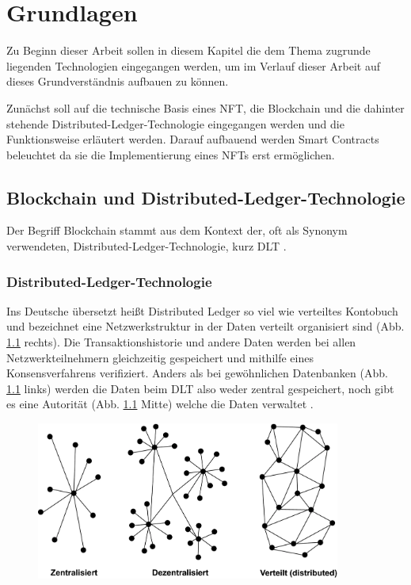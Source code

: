 \chapter{Grundlagen}

Zu Beginn dieser Arbeit sollen in diesem Kapitel die dem Thema zugrunde liegenden Technologien eingegangen werden, um im Verlauf dieser Arbeit auf dieses Grundverständnis aufbauen zu können.

Zunächst soll auf die technische Basis  eines \ac{NFT}, die Blockchain und die dahinter stehende Distributed-Ledger-Technologie eingegangen werden und die Funktionsweise erläutert werden.
Darauf aufbauend werden Smart Contracts beleuchtet da sie die Implementierung eines NFTs erst ermöglichen.

\section{Blockchain und Distributed-Ledger-Technologie}

Der Begriff Blockchain stammt aus dem Kontext der, oft als Synonym verwendeten, Distributed-Ledger-Technologie, kurz DLT \parencite[vgl.][5]{WILKENS.2019}.

\subsection{Distributed-Ledger-Technologie}

Ins Deutsche übersetzt heißt Distributed Ledger so viel wie verteiltes Kontobuch und bezeichnet eine Netzwerkstruktur in der Daten verteilt organisiert sind (Abb. \ref*{fig:network} rechts).
Die Transaktionshistorie und andere Daten werden bei allen Netzwerkteilnehmern gleichzeitig gespeichert und mithilfe eines Konsensverfahrens verifiziert.
Anders als bei gewöhnlichen Datenbanken (Abb. \ref{fig:network} links) werden die Daten beim \ac{DLT} also weder zentral gespeichert, noch gibt es eine Autorität (Abb. \ref{fig:network} Mitte) welche die Daten verwaltet
\parencite[vgl.][4]{janaessebier.2017}.

    \begin{figure}
        \includegraphics[width=10cm]{Bilder/Netzwerk2 (convert.io).png}
        \centering
        \label{fig:network}
    \end{figure}

